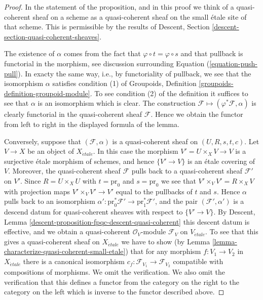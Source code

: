 \begin{proof}
In the statement of the proposition, and in this proof we think of a
quasi-coherent sheaf on a scheme as a quasi-coherent sheaf on the small
\'etale site of that scheme. This is permissible by the results of
Descent, Section \ref{descent-section-quasi-coherent-sheaves}.

\medskip\noindent
The existence of $\alpha$ comes from the fact that
$\varphi \circ t = \varphi \circ s$ and that pullback is
functorial in the morphism, see discussion surrounding
Equation (\ref{equation-push-pull}). In exacty the same way, i.e., by
functoriality of pullback, we see that the isomorphism $\alpha$ satisfies
condition (1) of
Groupoids, Definition \ref{groupoids-definition-groupoid-module}.
To see condition (2) of the definition it suffices to see that $\alpha$
is an isomorphism which is clear. The construction
$\mathcal{F} \mapsto (\varphi^*\mathcal{F}, \alpha)$
is clearly functorial in the quasi-coherent sheaf $\mathcal{F}$.
Hence we obtain the functor from left to right in the displayed
formula of the lemma.

\medskip\noindent
Conversely, suppose that $(\mathcal{F}, \alpha)$ is a quasi-coherent
sheaf on $(U, R, s, t, c)$. Let $V \to X$ be an object of $X_{\acute{e}tale}$.
In this case the morphism $V' = U \times_X V \to V$ is a surjective \'etale
morphism of schemes, and hence $\{V' \to V\}$ is an \'etale
covering of $V$. Moreover, the quasi-coherent sheaf $\mathcal{F}$
pulls back to a quasi-coherent sheaf $\mathcal{F}'$ on $V'$.
Since $R = U \times_X U$ with $t = \text{pr}_0$ and $s = \text{pr}_0$
we see that $V' \times_V V' = R \times_X V$ with projection maps
$V' \times_V V' \to V'$ equal to the pullbacks of $t$ and $s$. Hence
$\alpha$ pulls back to an isomorphism
$\alpha' : \text{pr}_0^*\mathcal{F}' \to \text{pr}_1^*\mathcal{F}'$, and
the pair $(\mathcal{F}', \alpha')$ is a descend datum for quasi-coherent
sheaves with respect to $\{V' \to V\}$. By
Descent, Lemma \ref{descent-proposition-fpqc-descent-quasi-coherent}
this descent datum is effective, and we obtain a quasi-coherent
$\mathcal{O}_V$-module $\mathcal{F}_V$ on $V_{\acute{e}tale}$.
To see that this gives a quasi-coherent sheaf on $X_{\acute{e}tale}$ we have
to show (by
Lemma \ref{lemma-characterize-quasi-coherent-small-etale})
that for any morphism $f : V_1 \to V_2$ in $X_{\acute{e}tale}$
there is a canonical isomorphism
$c_f : \mathcal{F}_{V_1} \to \mathcal{F}_{V_2}$
compatible with compositions of morphisms. We omit the verification.
We also omit the verification that this defines a functor from the
category on the right to the category on the left which is inverse
to the functor described above.
\end{proof}




